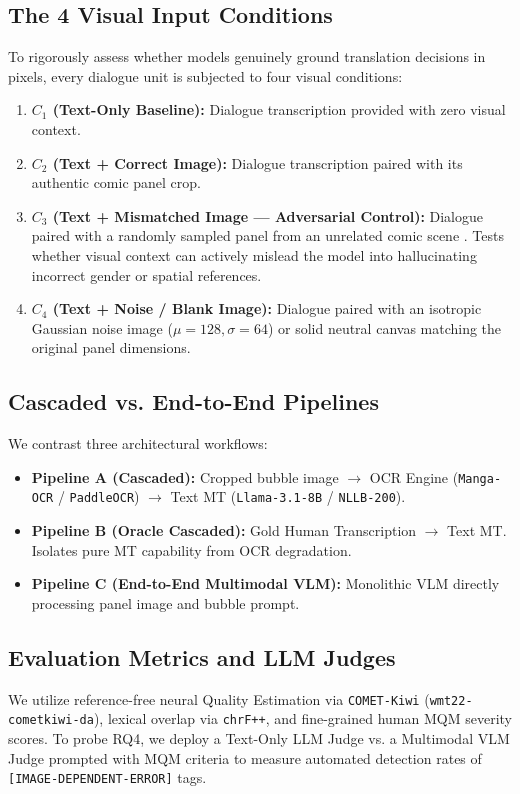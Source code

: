 \documentclass[11pt,a4paper]{article}
\begin{document}
\subsection{The 4 Visual Input Conditions}
To rigorously assess whether models genuinely ground translation decisions in pixels, every dialogue unit is subjected to four visual conditions:
\begin{enumerate}[noitemsep]
    \item \textbf{$C_1$ (Text-Only Baseline):} Dialogue transcription provided with zero visual context.
    \item \textbf{$C_2$ (Text + Correct Image):} Dialogue transcription paired with its authentic comic panel crop.
    \item \textbf{$C_3$ (Text + Mismatched Image --- Adversarial Control):} Dialogue paired with a randomly sampled panel from an unrelated comic scene \cite{elliott2018adversarial}. Tests whether visual context can actively mislead the model into hallucinating incorrect gender or spatial references.
    \item \textbf{$C_4$ (Text + Noise / Blank Image):} Dialogue paired with an isotropic Gaussian noise image ($\mu=128, \sigma=64$) or solid neutral canvas matching the original panel dimensions.
\end{enumerate}

\subsection{Cascaded vs. End-to-End Pipelines}
We contrast three architectural workflows:
\begin{itemize}[noitemsep]
    \item \textbf{Pipeline A (Cascaded):} Cropped bubble image $\to$ OCR Engine (\texttt{Manga-OCR} / \texttt{PaddleOCR}) $\to$ Text MT (\texttt{Llama-3.1-8B} / \texttt{NLLB-200}).
    \item \textbf{Pipeline B (Oracle Cascaded):} Gold Human Transcription $\to$ Text MT. Isolates pure MT capability from OCR degradation.
    \item \textbf{Pipeline C (End-to-End Multimodal VLM):} Monolithic VLM directly processing panel image and bubble prompt.
\end{itemize}

\subsection{Evaluation Metrics and LLM Judges}
We utilize reference-free neural Quality Estimation via \texttt{COMET-Kiwi} (\texttt{wmt22-cometkiwi-da}), lexical overlap via \texttt{chrF++}, and fine-grained human MQM severity scores. To probe RQ4, we deploy a Text-Only LLM Judge vs. a Multimodal VLM Judge prompted with MQM criteria to measure automated detection rates of \texttt{[IMAGE-DEPENDENT-ERROR]} tags.
\end{document}

